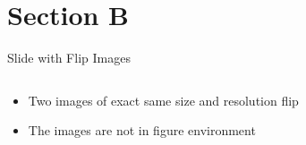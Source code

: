 \documentclass[aspectratio=169]{beamer}
\begin{document}
\section{Section B}
%
%
%
\begin{frame}{Slide with Flip Images}
    \begin{columns}
        \begin{column}{0.49\textwidth}
            \begin{itemize}
                \item Two images of exact same size and resolution flip
                \item The images are not in figure environment
            \end{itemize}
        \end{column}
        \begin{column}{0.49\textwidth}
        \end{column}
    \end{columns}
\end{frame} 
%
%
%
\end{document}

